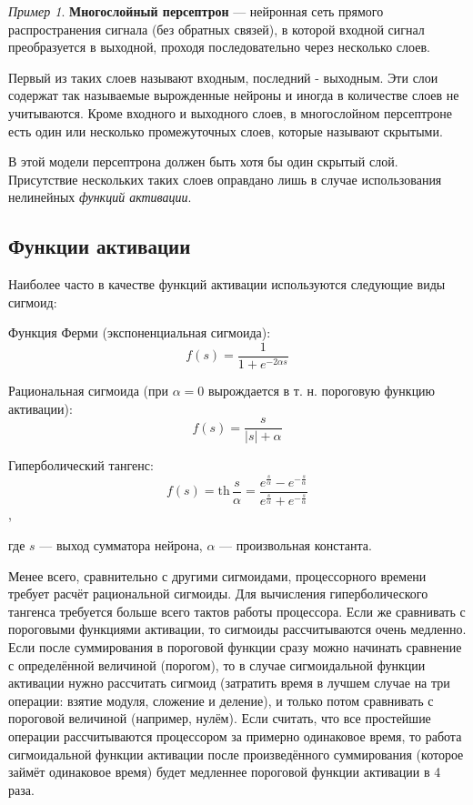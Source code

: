 \documentclass[a4paper, 12pt]{article}
\theoremstyle{plain} %
\theoremstyle{definition} %
\theoremstyle{remark} %
\newtheorem{example}{Пример}
\begin{document}
\begin{example}
\textbf{Многослойный персептрон} --- нейронная сеть прямого распространения сигнала (без обратных связей), в которой входной сигнал преобразуется в выходной, проходя последовательно через несколько слоев.

Первый из таких слоев называют входным, последний - выходным. Эти слои содержат так называемые вырожденные нейроны и иногда в количестве слоев не учитываются. Кроме входного и выходного слоев, в многослойном персептроне есть один или несколько промежуточных слоев, которые называют скрытыми.

В этой модели персептрона должен быть хотя бы один скрытый слой. Присутствие нескольких таких слоев оправдано лишь в случае использования нелинейных \emph{функций активации}.

\subsection{Функции активации}

Наиболее часто в качестве функций активации используются следующие виды сигмоид:

Функция Ферми (экспоненциальная сигмоида):
\[
	f(s)= \frac{1}{1+e^{-2 \alpha s}}
\]

Рациональная сигмоида (при $\alpha=0$ вырождается в т. н. пороговую функцию активации):
\[
f(s)= \frac{s}{|s|+ \alpha}
\]

Гиперболический тангенс:
\[
	f(s)= \mathrm{th}\, \frac{s}{\alpha} = \frac{ e^{ \frac{s}{\alpha} } - e^{ - \frac{s}{\alpha}} }
	{e^{ \frac{s}{\alpha} } + e^{ - \frac{s}{\alpha}}}
\]
,

где $s$ — выход сумматора нейрона, $\alpha$ — произвольная константа.

Менее всего, сравнительно с другими сигмоидами, процессорного времени требует расчёт рациональной сигмоиды. Для вычисления гиперболического тангенса требуется больше всего тактов работы процессора. Если же сравнивать с пороговыми функциями активации, то сигмоиды рассчитываются очень медленно. Если после суммирования в пороговой функции сразу можно начинать сравнение с определённой величиной (порогом), то в случае сигмоидальной функции активации нужно рассчитать сигмоид (затратить время в лучшем случае на три операции: взятие модуля, сложение и деление), и только потом сравнивать с пороговой величиной (например, нулём). Если считать, что все простейшие операции рассчитываются процессором за примерно одинаковое время, то работа сигмоидальной функции активации после произведённого суммирования (которое займёт одинаковое время) будет медленнее пороговой функции активации в 4 раза.


\end{example}
\end{document}
